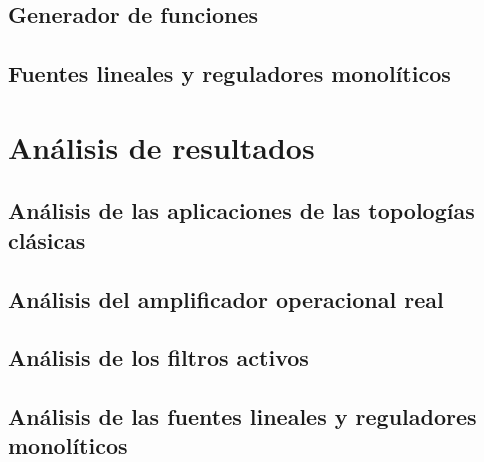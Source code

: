 \documentclass{article}
\begin{document}
\subsection{Generador de funciones}

\FloatBarrier
\subsection{Fuentes lineales y reguladores monolíticos}

\section{Análisis de resultados}
\subsection{Análisis de las aplicaciones de las topologías clásicas}

\FloatBarrier
\subsection{Análisis del amplificador operacional real}

\FloatBarrier
\subsection{Análisis de los filtros activos}

\FloatBarrier
\subsection{Análisis de las fuentes lineales y reguladores monolíticos}
\FloatBarrier


\FloatBarrier
% 
\printbibliography[heading=bibintoc, title={Bibliografía}]
\end{document}
